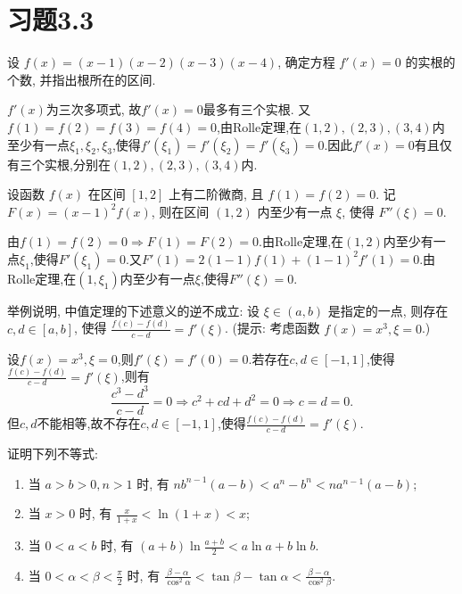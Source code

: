 \section{习题3.3}

\begin{exercise}[3.3.1]
    设 $f(x)=(x-1)(x-2)(x-3)(x-4)$, 确定方程 $f'(x)=0$ 的实根的个数, 并指出根所在的区间.
\end{exercise}

\begin{solution}
    $f'(x)$为三次多项式, 故$f'(x)=0$最多有三个实根. 又$f(1) = f(2) = f(3) = f(4) = 0$,由Rolle定理,在$(1,2),(2,3),(3,4)$内至少有一点$\xi_1,\xi_2,\xi_3$,使得$f'(\xi_1) = f'(\xi_2) = f'(\xi_3) = 0$.因此$f'(x)=0$有且仅有三个实根,分别在$(1,2),(2,3),(3,4)$内.
\end{solution}

\begin{exercise}[3.3.2]
    设函数 $f(x)$ 在区间 $[1,2]$ 上有二阶微商, 且 $f(1)=f(2)=0$. 记 $F(x)=(x-1)^2 f(x)$, 则在区间 $(1,2)$ 内至少有一点 $\xi$, 使得 $F''(\xi)=0$.
\end{exercise}

\begin{solution}
    由$f(1) = f(2) = 0 \Rightarrow F(1) = F(2) = 0$.由Rolle定理,在$(1,2)$内至少有一点$\xi_1$,使得$F'(\xi_1) = 0$.又$F'(1) = 2(1-1)f(1) + (1-1)^2 f'(1) = 0$.由Rolle定理,在$(1,\xi_1)$内至少有一点$\xi$,使得$F''(\xi) = 0$.
\end{solution}

\begin{exercise}[3.3.3]
    举例说明, 中值定理的下述意义的逆不成立: 设 $\xi \in (a,b)$ 是指定的一点, 则存在 $c,d \in [a,b]$, 使得 $\frac{f(c)-f(d)}{c-d}=f'(\xi)$. (提示: 考虑函数 $f(x)=x^3, \xi=0$.)
\end{exercise}

\begin{solution}
    设$f(x) = x^3, \xi = 0$,则$f'(\xi) = f'(0) = 0$.若存在$c,d \in [-1,1]$,使得$\frac{f(c)-f(d)}{c-d} = f'(\xi)$,则有
    $$
        \frac{c^3 - d^3}{c-d} = 0 \Rightarrow c^2 + cd + d^2 = 0 \Rightarrow c = d = 0.
    $$
    但$c,d$不能相等,故不存在$c,d \in [-1,1]$,使得$\frac{f(c)-f(d)}{c-d} = f'(\xi)$.
\end{solution}

\begin{exercise}[3.3.4]
    证明下列不等式:
    \begin{enumerate}
        \item 当 $a>b>0, n>1$ 时, 有 $nb^{n-1}(a-b) < a^n-b^n < na^{n-1}(a-b)$;
        \item 当 $x>0$ 时, 有 $\frac{x}{1+x} < \ln(1+x) < x$;
        \item 当 $0<a<b$ 时, 有 $(a+b)\ln\frac{a+b}{2} < a\ln a + b\ln b$.
        \item 当 $0<\alpha<\beta<\frac{\pi}{2}$ 时, 有 $\frac{\beta-\alpha}{\cos^2\alpha} < \tan\beta - \tan\alpha < \frac{\beta-\alpha}{\cos^2\beta}$.
    \end{enumerate}
\end{exercise}


